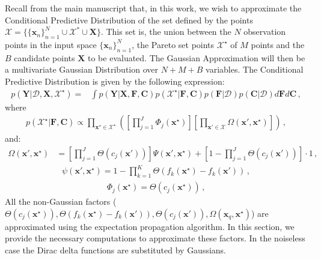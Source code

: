 Recall from the main manuscript that, in this work, we wish to approximate the Conditional Predictive Distribution of the set defined by the points $\mathcal{X} = \{\{\boldsymbol{x}_n\}_{n=1}^{N} \cup \mathcal{X}^* \cup \boldsymbol{X}\}$. This set is, the union between the $N$ observation points in the input space $\{\boldsymbol{x}_n\}_{n=1}^{N}$, the Pareto set points $\mathcal{X}^\star$ of $M$ points and the $B$ candidate points $\mathbf{X}$ to be evaluated. The Gaussian Approximation will then be a multivariate Gaussian Distribution over $N+M+B$ variables. The Conditional Predictive Distribution is given by the following expression:
\begin{align}
p(\mathbf{Y}|\mathcal{D},\mathbf{X},\mathcal{X}^\star) = & 
        \int p(\mathbf{Y}|\mathbf{X},\mathbf{F},\mathbf{C}) p(\mathcal{X}^\star|\mathbf{F},\mathbf{C})
        p(\mathbf{F}|\mathcal{D}) p(\mathbf{C}|\mathcal{D}) d\mathbf{F} d \mathbf{C}\,,
        \label{eq:conditional_pred}
\end{align}
where
{\small
\begin{align}
p(\mathcal{X}^\star|\mathbf{F},\mathbf{C}) \propto 
        \prod_{\mathbf{x}^\star \in \mathcal{X}^\star}
        \left( \left[ \prod_{j=1}^J \Phi_j(\mathbf{x}^\star) \right] \left[ \prod_{\mathbf{x}'\in \mathcal{X}}
        \Omega(\mathbf{x}',\mathbf{x}^\star)\right]
        \right)\,,
        \label{eq:prob_pareto_set}
\end{align}}
and:
{\small
\begin{align}
\Omega(\mathbf{x}',\mathbf{x}^\star) &= \left[ \prod_{j=1}^J \Theta(c_j(\mathbf{x}')) \right]
\Psi(\mathbf{x}',\mathbf{x}^\star) + \left[1 - \prod_{j=1}^J \Theta(c_j(\mathbf{x}')) \right] \cdot 1\,,
\end{align}}
\begin{align}
\psi(\textbf{x}',\textbf{x}^{\star}) = 1 - \prod_{k=1}^K \Theta (f_k(\textbf{x}^{\star})-f_k(\textbf{x}'))\,,
\end{align}
\begin{align}
\Phi_j(\mathbf{x}^\star) = \Theta(c_j(\mathbf{x}^\star))\,,
\end{align}
All the non-Gaussian factors ($\Theta(c_j(\mathbf{x}^\star)), \Theta (f_k(\textbf{x}^{\star})-f_k(\textbf{x}')), \Theta(c_j(\mathbf{x}')), \Omega(\textbf{x}_q,\textbf{x}^{\star})$) are approximated using the expectation propagation algorithm. In this section, we provide the necessary computations to approximate these factors. In the noiseless case the Dirac delta functions are substituted by Gaussians.

